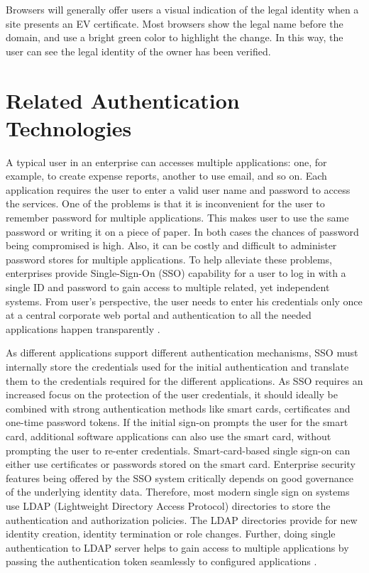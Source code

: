 \begin{multicols}{2}
Browsers will generally offer users a visual indication of the legal identity when a site presents an EV certificate. Most browsers show the legal name before the domain, and use a bright green color to highlight the change. In this way, the user can see the legal identity of the owner has been verified.

\section*{Related Authentication Technologies}

A typical user in an enterprise can accesses multiple applications: one, for example, to create expense reports, another to use email, and so on. Each application requires the user to enter a valid user name and password to access the services. One of the problems is that it is inconvenient for the user to remember password for multiple applications. This makes user to use the same password or writing it on a piece of paper. In both cases the chances of password being compromised is high. Also, it can be costly and difficult to administer password stores for multiple applications. To help alleviate these problems, enterprises provide Single-Sign-On (SSO) capability for a user to log in with a single ID and password to gain access to multiple related, yet independent systems. From user's perspective, the user needs to enter his credentials only once at a central corporate web portal and authentication to all the needed applications happen transparently \cite{key19}.

As different applications support different authentication mechanisms, SSO must internally store the credentials used for the initial authentication and translate them to the credentials required for the different applications. As SSO requires an increased focus on the protection of the user credentials, it should ideally be combined with strong authentication methods like smart cards, certificates and one-time password tokens. If the initial sign-on prompts the user for the smart card, additional software applications can also use the smart card, without prompting the user to re-enter credentials. Smart-card-based single sign-on can either use certificates or passwords stored on the smart card. Enterprise security features being offered by the SSO system critically depends on good governance of the underlying identity data. Therefore, most modern single sign on systems use LDAP (Lightweight Directory Access Protocol) directories to store the authentication and authorization policies. The LDAP directories provide for new identity creation, identity termination or role changes. Further, doing single authentication to LDAP server helps to gain access to multiple applications by passing the authentication token seamlessly to configured applications \cite{key20}.


\end{multicols}
